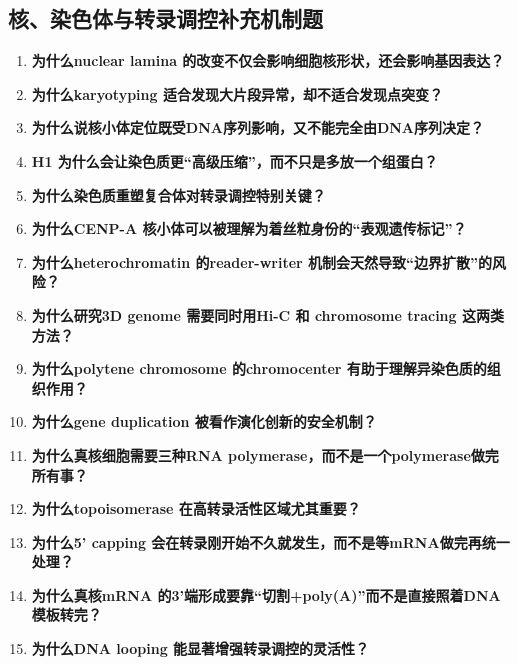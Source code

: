 \documentclass[12pt,fontset=none]{ctexart}
\begin{document}
\subsection*{核、染色体与转录调控补充机制题}
\begin{enumerate}
\item \textbf{为什么nuclear lamina 的改变不仅会影响细胞核形状，还会影响基因表达？}

\item \textbf{为什么karyotyping 适合发现大片段异常，却不适合发现点突变？}

\item \textbf{为什么说核小体定位既受DNA序列影响，又不能完全由DNA序列决定？}

\item \textbf{H1 为什么会让染色质更“高级压缩”，而不只是多放一个组蛋白？}

\item \textbf{为什么染色质重塑复合体对转录调控特别关键？}

\item \textbf{为什么CENP-A 核小体可以被理解为着丝粒身份的“表观遗传标记”？}

\item \textbf{为什么heterochromatin 的reader-writer 机制会天然导致“边界扩散”的风险？}

\item \textbf{为什么研究3D genome 需要同时用Hi-C 和 chromosome tracing 这两类方法？}

\item \textbf{为什么polytene chromosome 的chromocenter 有助于理解异染色质的组织作用？}

\item \textbf{为什么gene duplication 被看作演化创新的安全机制？}

\item \textbf{为什么真核细胞需要三种RNA polymerase，而不是一个polymerase做完所有事？}

\item \textbf{为什么topoisomerase 在高转录活性区域尤其重要？}

\item \textbf{为什么5' capping 会在转录刚开始不久就发生，而不是等mRNA做完再统一处理？}

\item \textbf{为什么真核mRNA 的3'端形成要靠“切割+poly(A)”而不是直接照着DNA模板转完？}

\item \textbf{为什么DNA looping 能显著增强转录调控的灵活性？}


\end{enumerate}
\end{document}
